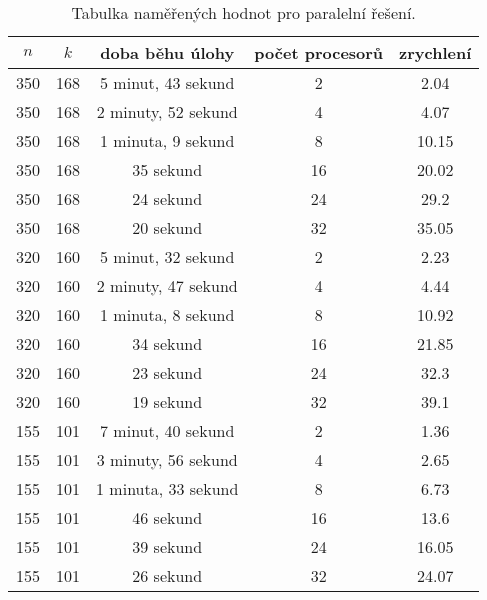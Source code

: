 \documentclass[12pt]{article}
\begin{document}
\begin{table}[ht]
  \begin{center}
    \begin{tabular}{| c | c | c | c | c |}
      \hline
      $n$ & $k$ & doba běhu úlohy     & počet procesorů & zrychlení \\ \hline
      350 & 168 & 5 minut, 43 sekund  & 2               & 2.04      \\ \hline
      350 & 168 & 2 minuty, 52 sekund & 4               & 4.07      \\ \hline
      350 & 168 & 1 minuta, 9 sekund  & 8               & 10.15     \\ \hline
      350 & 168 & 35 sekund           & 16              & 20.02     \\ \hline
      350 & 168 & 24 sekund           & 24              & 29.2      \\ \hline
      350 & 168 & 20 sekund           & 32              & 35.05     \\ \hline
      320 & 160 & 5 minut, 32 sekund  & 2               & 2.23      \\ \hline
      320 & 160 & 2 minuty, 47 sekund & 4               & 4.44      \\ \hline
      320 & 160 & 1 minuta, 8 sekund  & 8               & 10.92     \\ \hline
      320 & 160 & 34 sekund           & 16              & 21.85     \\ \hline
      320 & 160 & 23 sekund           & 24              & 32.3      \\ \hline
      320 & 160 & 19 sekund           & 32              & 39.1      \\ \hline
      155 & 101 & 7 minut, 40 sekund  & 2               & 1.36      \\ \hline
      155 & 101 & 3 minuty, 56 sekund & 4               & 2.65      \\ \hline
      155 & 101 & 1 minuta, 33 sekund & 8               & 6.73      \\ \hline
      155 & 101 & 46 sekund           & 16              & 13.6      \\ \hline
      155 & 101 & 39 sekund           & 24              & 16.05     \\ \hline
      155 & 101 & 26 sekund           & 32              & 24.07     \\
      \hline
    \end{tabular}
    \caption{Tabulka naměřených hodnot pro paralelní řešení.}
  \end{center}
\end{table}
\end{document}
